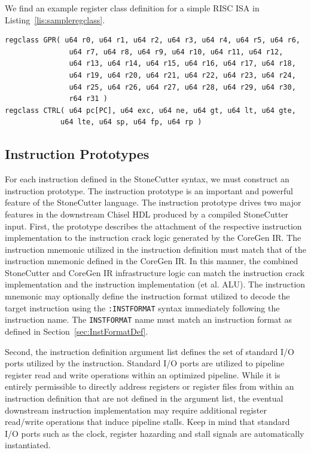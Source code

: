 \documentclass{article}
\begin{document}
We find an example register class definition for a simple RISC ISA in Listing~\ref{lis:sampleregclass}.  

\vspace{0.125in}
\begin{lstlisting}[frame=single,style=base,caption={Sample Register Class Definition},captionpos=b,label={lis:sampleregclass}]
regclass GPR( u64 r0, u64 r1, u64 r2, u64 r3, u64 r4, u64 r5, u64 r6, 
		       u64 r7, u64 r8, u64 r9, u64 r10, u64 r11, u64 r12, 
		       u64 r13, u64 r14, u64 r15, u64 r16, u64 r17, u64 r18,
		       u64 r19, u64 r20, u64 r21, u64 r22, u64 r23, u64 r24, 
		       u64 r25, u64 r26, u64 r27, u64 r28, u64 r29, u64 r30,
		       r64 r31 )
regclass CTRL( u64 pc[PC], u64 exc, u64 ne, u64 gt, u64 lt, u64 gte,
			 u64 lte, u64 sp, u64 fp, u64 rp )
\end{lstlisting}

\clearpage
\subsection{Instruction Prototypes}
\label{sec:InstructionPrototypes}

For each instruction defined in the StoneCutter syntax, we must construct 
an instruction prototype.  The instruction prototype is an important and powerful 
feature of the StoneCutter language.  The instruction prototype drives two major 
features in the downstream Chisel HDL produced by a compiled StoneCutter input.  
First, the prototype describes the attachment of the respective instruction implementation 
to the instruction crack logic generated by the CoreGen IR.  The instruction mnemonic 
utilized in the instruction definition must match that of the instruction mnemonic defined 
in the CoreGen IR.  In this manner, the combined StoneCutter and CoreGen IR infrastructure 
logic can match the instruction crack implementation and the instruction implementation (et al. ALU).  
The instruction mnemonic may optionally define the instruction format utilized to decode the 
target instruction using the \texttt{:INSTFORMAT} syntax immediately following the instruction name.  
The \texttt{INSTFORMAT} name must match an instruction format as defined in Section~\ref{sec:InstFormatDef}.    

Second, the instruction definition argument list defines the set of standard I/O ports utilized by the 
instruction.  Standard I/O ports are utilized to pipeline register read and write operations within an 
optimized pipeline.  While it is entirely permissible to directly address registers or register files 
from within an instruction definition that are not defined in the argument list, the eventual downstream 
instruction implementation may require additional register read/write operations that induce pipeline 
stalls.  Keep in mind that standard I/O ports such as the clock, register hazarding and stall signals 
are automatically instantiated.  
\end{document}
